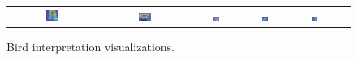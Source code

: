 \documentclass[a4paper,12pt]{report}
\begin{document}
\begin{figure}[htbp]
\begin{tabular}{cccccc}
        \includegraphics[width=0.15\textwidth]{images/interpretability/vgg/bird7.jpg} &
        \includegraphics[width=0.15\textwidth]{images/interpretability/vgg/bird8.jpg} &
        \includegraphics[width=0.15\textwidth]{images/interpretability/vgg/bird9.jpeg} &
        \includegraphics[width=0.15\textwidth]{images/interpretability/vgg/bird10.jpeg} &
        \includegraphics[width=0.15\textwidth]{images/interpretability/vgg/bird11.jpeg} \\
    \end{tabular}
    \caption{Bird interpretation visualizations.}
    \label{fig:bird-interpretability}
\end{figure}
\end{document}
